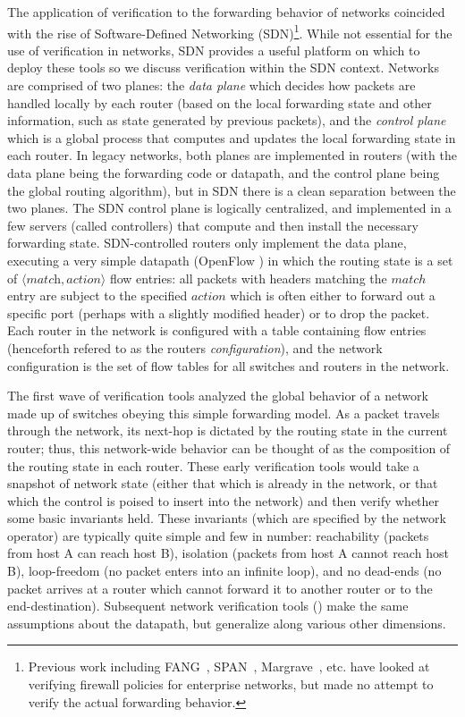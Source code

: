 \cbstart
The application of verification to the forwarding behavior of networks coincided with the rise of Software-Defined Networking (SDN)\footnote{Previous work including FANG~\cite{mayer2000fang}, SPAN~\cite{gupta2009span}, Margrave~\cite{nelson2010margrave}, etc. have looked at verifying firewall policies for enterprise networks, but made no attempt to verify the actual forwarding behavior.}. While not essential for the use of verification in networks, SDN provides a useful platform on which to deploy these tools so we discuss verification within the SDN context. Networks are comprised of two planes: the {\em data plane} which decides how packets are handled locally by each router (based on the local forwarding state and other information, such as state generated by previous packets), and the {\em control plane} which is a global process that computes and updates the local forwarding state in each router. In legacy networks, both planes are implemented in routers (with the data plane being the forwarding code or datapath, and the control plane being the global routing algorithm), but in SDN there is a clean separation between the two planes. The SDN control plane is logically centralized, and implemented in a few servers (called controllers) that compute and then install the necessary forwarding state. SDN-controlled routers only implement the data plane, executing a very simple datapath (OpenFlow \cite{openflow}) in which the routing state is a set of $\langle \textit{match}, \textit{action} \rangle$ flow entries: all packets with headers matching the $match$ entry are subject to the specified $action$ which is often either to forward out a specific port (perhaps with a slightly modified header) or to drop the packet. Each router in the network is configured with a table containing flow entries (henceforth refered to as the routers {\em configuration}), and the network configuration is the set of flow tables for all switches and routers in the network.
\cbend

The first wave of verification tools \cite{anteater,khurshid2012veriflow,oldhsa,kazemian2013real} analyzed the global behavior of a network made up of switches obeying this simple forwarding model. As a packet travels through the network, its next-hop is dictated by the routing state in the current router; thus, this network-wide behavior can be thought of as the composition of the routing state in each router. These early verification tools would take a snapshot of network state (either that which is already in the network, or that which the control is poised to insert into the network) and then verify whether some basic invariants held. These invariants (which are specified by the network operator) are typically quite simple and few in number: reachability (\eg packets from host A can reach host B), isolation (\eg packets from host A cannot reach host B), loop-freedom (no packet enters into an infinite loop), and no dead-ends (no packet arrives at a router which cannot forward it to another router or to the end-destination). Subsequent network verification tools (\eg \cite{guha2013machine,anderson2014netkat,flowlog, nelson2013balance}) make the same assumptions about the datapath, but generalize along various other dimensions.

